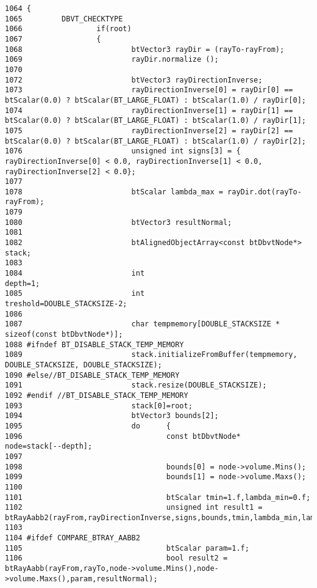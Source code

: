 \begin{Code}\begin{verbatim}1064 {
1065         DBVT_CHECKTYPE
1066                 if(root)
1067                 {
1068                         btVector3 rayDir = (rayTo-rayFrom);
1069                         rayDir.normalize ();
1070 
1072                         btVector3 rayDirectionInverse;
1073                         rayDirectionInverse[0] = rayDir[0] == btScalar(0.0) ? btScalar(BT_LARGE_FLOAT) : btScalar(1.0) / rayDir[0];
1074                         rayDirectionInverse[1] = rayDir[1] == btScalar(0.0) ? btScalar(BT_LARGE_FLOAT) : btScalar(1.0) / rayDir[1];
1075                         rayDirectionInverse[2] = rayDir[2] == btScalar(0.0) ? btScalar(BT_LARGE_FLOAT) : btScalar(1.0) / rayDir[2];
1076                         unsigned int signs[3] = { rayDirectionInverse[0] < 0.0, rayDirectionInverse[1] < 0.0, rayDirectionInverse[2] < 0.0};
1077 
1078                         btScalar lambda_max = rayDir.dot(rayTo-rayFrom);
1079 
1080                         btVector3 resultNormal;
1081 
1082                         btAlignedObjectArray<const btDbvtNode*> stack;
1083 
1084                         int                                                             depth=1;
1085                         int                                                             treshold=DOUBLE_STACKSIZE-2;
1086 
1087                         char tempmemory[DOUBLE_STACKSIZE * sizeof(const btDbvtNode*)];
1088 #ifndef BT_DISABLE_STACK_TEMP_MEMORY
1089                         stack.initializeFromBuffer(tempmemory, DOUBLE_STACKSIZE, DOUBLE_STACKSIZE);
1090 #else//BT_DISABLE_STACK_TEMP_MEMORY
1091                         stack.resize(DOUBLE_STACKSIZE);
1092 #endif //BT_DISABLE_STACK_TEMP_MEMORY
1093                         stack[0]=root;
1094                         btVector3 bounds[2];
1095                         do      {
1096                                 const btDbvtNode*       node=stack[--depth];
1097 
1098                                 bounds[0] = node->volume.Mins();
1099                                 bounds[1] = node->volume.Maxs();
1100                                 
1101                                 btScalar tmin=1.f,lambda_min=0.f;
1102                                 unsigned int result1 = btRayAabb2(rayFrom,rayDirectionInverse,signs,bounds,tmin,lambda_min,lambda_max);
1103 
1104 #ifdef COMPARE_BTRAY_AABB2
1105                                 btScalar param=1.f;
1106                                 bool result2 = btRayAabb(rayFrom,rayTo,node->volume.Mins(),node->volume.Maxs(),param,resultNormal);

\end{verbatim}
\end{Code}

